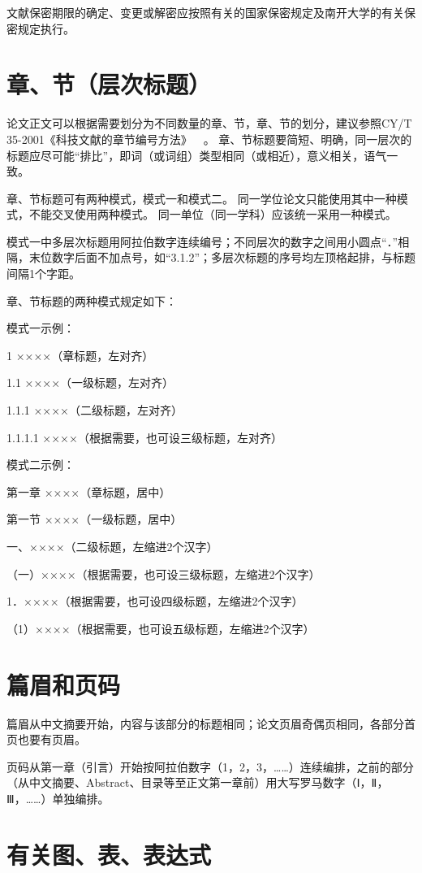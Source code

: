 文献保密期限的确定、变更或解密应按照有关的国家保密规定及南开大学的有关保密规定执行。

\section{章、节（层次标题）}

论文正文可以根据需要划分为不同数量的章、节，章、节的划分，建议参照CY/T 35-2001《科技文献的章节编号方法》~~\cite{REF00000004}。
章、节标题要简短、明确，同一层次的标题应尽可能“排比”，即词（或词组）类型相同（或相近），意义相关，语气一致。

章、节标题可有两种模式，模式一和模式二。
同一学位论文只能使用其中一种模式，不能交叉使用两种模式。
同一单位（同一学科）应该统一采用一种模式。

模式一中多层次标题用阿拉伯数字连续编号；不同层次的数字之间用小圆点“．”相隔，末位数字后面不加点号，如“3.1.2”；多层次标题的序号均左顶格起排，与标题间隔1个字距。

章、节标题的两种模式规定如下：

模式一示例：

1 ××××（章标题，左对齐）

1.1 ××××（一级标题，左对齐）

1.1.1 ××××（二级标题，左对齐）

1.1.1.1 ××××（根据需要，也可设三级标题，左对齐）

模式二示例：

第一章 ××××（章标题，居中）

第一节 ××××（一级标题，居中）

一、××××（二级标题，左缩进2个汉字）

（一）××××（根据需要，也可设三级标题，左缩进2个汉字）

1．××××（根据需要，也可设四级标题，左缩进2个汉字）

（1）××××（根据需要，也可设五级标题，左缩进2个汉字）

\section{篇眉和页码}

篇眉从中文摘要开始，内容与该部分的标题相同；论文页眉奇偶页相同，各部分首页也要有页眉。

页码从第一章（引言）开始按阿拉伯数字（1，2，3，……）连续编排，之前的部分（从中文摘要、Abstract、目录等至正文第一章前）用大写罗马数字（Ⅰ，Ⅱ，Ⅲ，……）单独编排。

\section{有关图、表、表达式}

